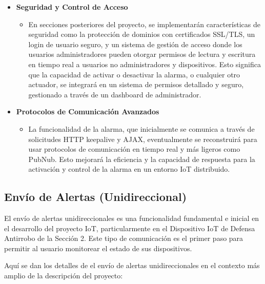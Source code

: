 \documentclass{report}
\begin{document}
\begin{itemize}
\begin{itemize}
        \item \textbf{Seguridad y Control de Acceso}
        \begin{itemize}
            \item En secciones posteriores del proyecto, se implementarán características de seguridad como la protección de dominios con certificados SSL/TLS, un 
            login de usuario seguro, y un sistema de gestión de acceso donde los usuarios administradores pueden otorgar permisos de lectura y escritura en tiempo 
            real a usuarios no administradores y dispositivos. Esto significa que la capacidad de activar o desactivar la alarma, o cualquier otro actuador, se 
            integrará en un sistema de permisos detallado y seguro, gestionado a través de un dashboard de administrador.
        \end{itemize}

        \item \textbf{Protocolos de Comunicación Avanzados}
        \begin{itemize}
            \item La funcionalidad de la alarma, que inicialmente se comunica a través de solicitudes HTTP keepalive y AJAX, eventualmente se reconstruirá para 
            usar protocolos de comunicación en tiempo real y más ligeros como PubNub. Esto mejorará la eficiencia y la capacidad de respuesta para la activación 
            y control de la alarma en un entorno IoT distribuido.
        \end{itemize}
    \end{itemize}
\end{itemize}

\subsection{Envío de Alertas (Unidireccional)}
El envío de alertas unidireccionales es una funcionalidad fundamental e inicial en el desarrollo del proyecto IoT, particularmente en el Dispositivo IoT 
de Defensa Antirrobo de la Sección 2. Este tipo de comunicación es el primer paso para permitir al usuario monitorear el estado de sus dispositivos.

Aquí se dan los detalles de el envío de alertas unidireccionales en el contexto más amplio de la descripción del proyecto:
\end{document}
